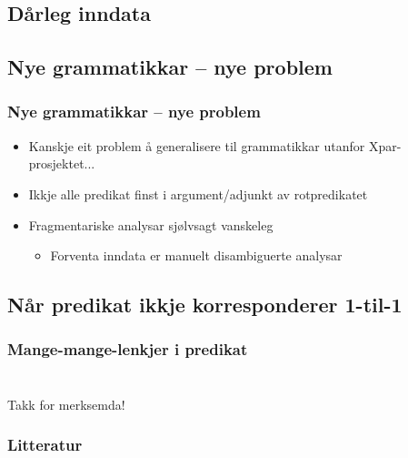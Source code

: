 \documentclass[xcolor=x11names,compress,bigger]{beamer}
\renewcommand{\(}{\begin{columns}}
\renewcommand{\)}{\end{columns}}
\newcommand{\<}[1]{\begin{column}{#1}}
\renewcommand{\>}{\end{column}}
\begin{document}
\subsection{Dårleg inndata}
\subsection{Nye grammatikkar -- nye problem}
\begin{frame}\frametitle{Nye grammatikkar -- nye problem}
  \begin{itemize}
  \item Kanskje eit problem å generalisere til grammatikkar utanfor Xpar-prosjektet...
  \item Ikkje alle predikat finst i argument/adjunkt av rotpredikatet
  \item Fragmentariske analysar sjølvsagt vanskeleg
    \begin{itemize}
    \item Forventa inndata er manuelt disambiguerte analysar
    \end{itemize}
  \end{itemize}
\end{frame}


\subsection{Når predikat ikkje korresponderer 1-til-1}
\begin{frame}\frametitle{Mange-mange-lenkjer i predikat}
  
\end{frame}


\section*{} %
\begin{frame}
  \begin{center}
    {\huge Takk for merksemda!}
  \end{center}
\end{frame}

\begin{frame}\frametitle{Litteratur}
  \renewcommand{\bibfont}{\footnotesize}
  \nocite{dyvik2009lmp}
  
  
\end{frame}
\end{document}
